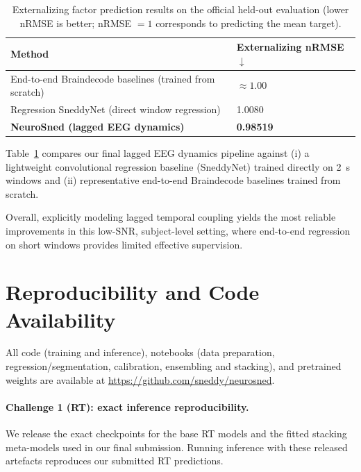 \documentclass[12pt]{article}
\begin{document}
\begin{table}[t!]
\caption{Externalizing factor prediction results on the official held-out evaluation (lower nRMSE is better; nRMSE $=1$
corresponds to predicting the mean target).}
\label{tab:results_ext}
\small
\centering
\renewcommand{\arraystretch}{1.2}
\begin{tabular}{ p{} p{}}
\hline
\textbf{Method} & \textbf{Externalizing nRMSE} $\downarrow$ \\
\hline
End-to-end Braindecode baselines (trained from scratch) & $\approx 1.00$ \\
Regression SneddyNet (direct window regression) & 1.0080 \\
\textbf{NeuroSned (lagged EEG dynamics)} & \textbf{0.98519} \\
\hline
\end{tabular}
\end{table}

Table~\ref{tab:results_ext} compares our final lagged EEG dynamics pipeline against (i) a lightweight convolutional
regression baseline (SneddyNet) trained directly on 2~s windows and (ii) representative end-to-end Braindecode baselines
trained from scratch.




Overall, explicitly modeling lagged temporal coupling yields the most reliable improvements in this low-SNR,
subject-level setting, where end-to-end regression on short windows provides limited effective supervision.

\section{Reproducibility and Code Availability}

\label{sec:repro}

All code (training and inference), notebooks (data preparation, regression/segmentation, calibration, ensembling and
stacking), and pretrained weights are available at \url{https://github.com/sneddy/neurosned}.

\paragraph{Challenge 1 (RT): exact inference reproducibility.}
We release the exact checkpoints for the base RT models and the fitted stacking meta-models used in our final submission.
Running inference with these released artefacts reproduces our submitted RT predictions.
\end{document}
